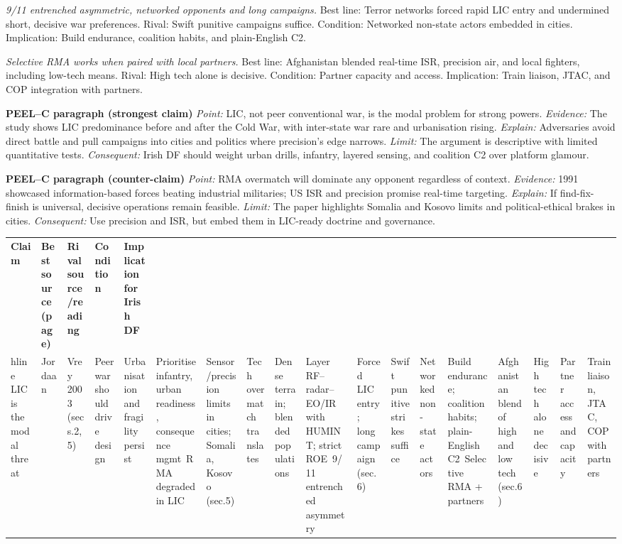 \textit{9/11 entrenched asymmetric, networked opponents and long campaigns.} Best line: Terror networks forced rapid LIC entry and undermined short, decisive war preferences. Rival: Swift punitive campaigns suffice. Condition: Networked non-state actors embedded in cities. Implication: Build endurance, coalition habits, and plain-English C2.

\textit{Selective RMA works when paired with local partners.} Best line: Afghanistan blended real-time ISR, precision air, and local fighters, including low-tech means. Rival: High tech alone is decisive. Condition: Partner capacity and access. Implication: Train liaison, JTAC, and COP integration with partners.

\textbf{PEEL–C paragraph (strongest claim)}
\textit{Point:} LIC, not peer conventional war, is the modal problem for strong powers.
\textit{Evidence:} The study shows LIC predominance before and after the Cold War, with inter-state war rare and urbanisation rising.
\textit{Explain:} Adversaries avoid direct battle and pull campaigns into cities and politics where precision’s edge narrows.
\textit{Limit:} The argument is descriptive with limited quantitative tests.
\textit{Consequent:} Irish DF should weight urban drills, infantry, layered sensing, and coalition C2 over platform glamour.

\textbf{PEEL–C paragraph (counter-claim)}
\textit{Point:} RMA overmatch will dominate any opponent regardless of context.
\textit{Evidence:} 1991 showcased information-based forces beating industrial militaries; US ISR and precision promise real-time targeting.
\textit{Explain:} If find-fix-finish is universal, decisive operations remain feasible.
\textit{Limit:} The paper highlights Somalia and Kosovo limits and political-ethical brakes in cities.
\textit{Consequent:} Use precision and ISR, but embed them in LIC-ready doctrine and governance.

\usepackage{array}
\begin{tabular}{p{3.2cm}p{4.2cm}p{3.6cm}p{3.2cm}p{4.2cm}}
	\textbf{Claim} & \textbf{Best source (page)} & \textbf{Rival source/reading} & \textbf{Condition} & \textbf{Implication for Irish DF}\\hline
	LIC is the modal threat & Jordaan & Vrey 2003 (secs.2,5) & Peer war should drive design & Urbanisation and fragility persist & Prioritise infantry, urban readiness, consequence mgmt\
	RMA degraded in LIC & Sensor/precision limits in cities; Somalia, Kosovo (sec.5) & Tech overmatch translates & Dense terrain; blended populations & Layer RF–radar–EO/IR with HUMINT; strict ROE\
	9/11 entrenched asymmetry & Forced LIC entry; long campaign (sec.6) & Swift punitive strikes suffice & Networked non-state actors & Build endurance; coalition habits; plain-English C2\
	Selective RMA + partners & Afghanistan blend of high and low tech (sec.6) & High tech alone decisive & Partner access and capacity & Train liaison, JTAC, COP with partners\
\end{tabular}



